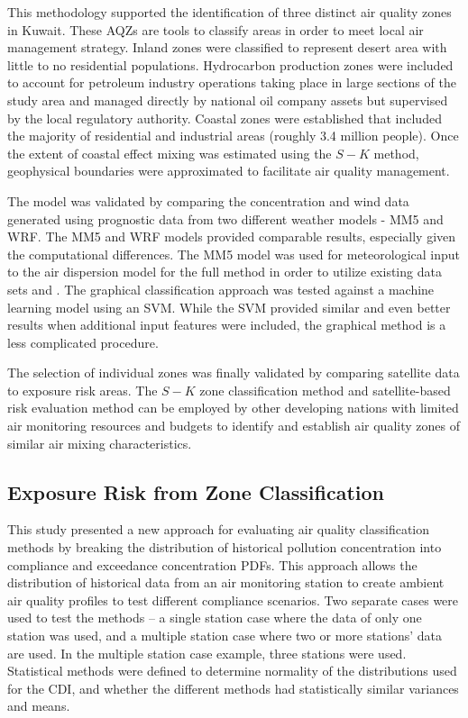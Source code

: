 This methodology supported the identification of three distinct air quality zones in Kuwait.  These AQZs are tools to classify areas in order to meet local air management strategy.  Inland zones were classified to represent  desert area with little to no residential populations.  Hydrocarbon production zones were included to account for petroleum industry operations taking place in large sections of the study area and managed directly by national oil company assets but supervised by the local regulatory authority.  Coastal zones were established that included the majority of residential and industrial areas (roughly 3.4 million people).  Once the extent of coastal effect mixing was estimated using the $S-K$ method, geophysical boundaries were approximated to facilitate air quality management. 

The model was validated by comparing the concentration and wind data generated using prognostic data from two different weather models - MM5 and WRF. The MM5 and WRF models provided comparable results, especially given the computational differences. The MM5 model was used for meteorological input to the air dispersion model for the full method in order to utilize existing data sets and . The graphical classification approach was tested against a machine learning model using an SVM. While the SVM provided similar and even better results when additional input features were included, the graphical method is a less complicated procedure.

The selection of individual zones was finally validated by comparing satellite data to exposure risk areas.  The $S-K$ zone classification method and satellite-based risk evaluation method can be employed by other developing nations with limited air monitoring resources and budgets to identify and establish air quality zones of similar air mixing characteristics.

\subsection{Exposure Risk from Zone Classification}

This study presented a new approach for evaluating air quality classification methods by breaking the distribution of historical pollution concentration into compliance and exceedance concentration PDFs. This approach allows the distribution of historical data from an air monitoring station to create ambient air quality profiles to test different compliance scenarios. Two separate cases were used to test the methods – a single station case where the data of only one station was used, and a multiple station case where two or more stations’ data are used. In the multiple station case example, three stations were used. Statistical methods were defined to determine normality of the distributions used for the CDI, and whether the different methods had statistically similar variances and means.

